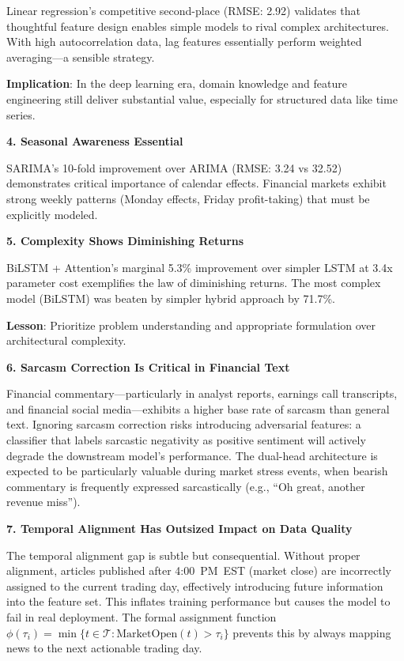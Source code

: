 Linear regression's competitive second-place (RMSE: 2.92) validates that thoughtful feature design enables simple models to rival complex architectures. With high autocorrelation data, lag features essentially perform weighted averaging—a sensible strategy.

\textbf{Implication}: In the deep learning era, domain knowledge and feature engineering still deliver substantial value, especially for structured data like time series.

\textbf{4. Seasonal Awareness Essential}

SARIMA's 10-fold improvement over ARIMA (RMSE: 3.24 vs 32.52) demonstrates critical importance of calendar effects. Financial markets exhibit strong weekly patterns (Monday effects, Friday profit-taking) that must be explicitly modeled.

\textbf{5. Complexity Shows Diminishing Returns}

BiLSTM + Attention's marginal 5.3\% improvement over simpler LSTM at 3.4x parameter cost exemplifies the law of diminishing returns. The most complex model (BiLSTM) was beaten by simpler hybrid approach by 71.7\%.

\textbf{Lesson}: Prioritize problem understanding and appropriate formulation over architectural complexity.

\textbf{6. Sarcasm Correction Is Critical in Financial Text}

Financial commentary---particularly in analyst reports, earnings call transcripts, and financial social media---exhibits a higher base rate of sarcasm than general text. Ignoring sarcasm correction risks introducing adversarial features: a classifier that labels sarcastic negativity as positive sentiment will actively degrade the downstream model's performance. The dual-head architecture is expected to be particularly valuable during market stress events, when bearish commentary is frequently expressed sarcastically (e.g., ``Oh great, another revenue miss'').

\textbf{7. Temporal Alignment Has Outsized Impact on Data Quality}

The temporal alignment gap is subtle but consequential. Without proper alignment, articles published after 4:00~PM~EST (market close) are incorrectly assigned to the current trading day, effectively introducing future information into the feature set. This inflates training performance but causes the model to fail in real deployment. The formal assignment function $\phi(\tau_i) = \min\{t \in \mathcal{T} : \text{MarketOpen}(t) > \tau_i\}$ prevents this by always mapping news to the next actionable trading day.

